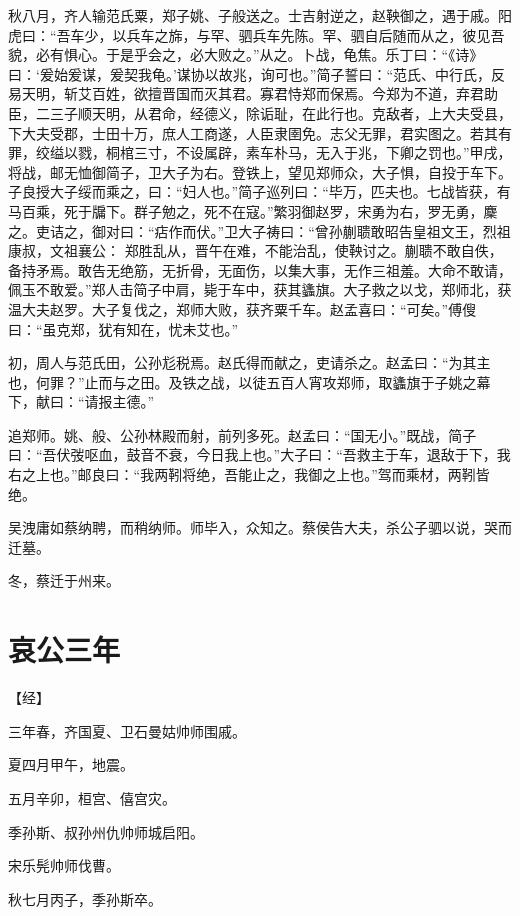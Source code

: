 \documentclass[a4paper,12pt,UTF8,twoside]{ctexbook}
\begin{document}
秋八月，齐人输范氏粟，郑子姚、子般送之。士吉射逆之，赵鞅御之，遇于戚。阳虎曰：“吾车少，以兵车之旆，与罕、驷兵车先陈。罕、驷自后随而从之，彼见吾貌，必有惧心。于是乎会之，必大败之。”从之。卜战，龟焦。乐丁曰：“《诗》曰：‘爰始爰谋，爰契我龟。’谋协以故兆，询可也。”简子誓曰：“范氏、中行氏，反易天明，斩艾百姓，欲擅晋国而灭其君。寡君恃郑而保焉。今郑为不道，弃君助臣，二三子顺天明，从君命，经德义，除诟耻，在此行也。克敌者，上大夫受县，下大夫受郡，士田十万，庶人工商遂，人臣隶圉免。志父无罪，君实图之。若其有罪，绞缢以戮，桐棺三寸，不设属辟，素车朴马，无入于兆，下卿之罚也。”甲戌，将战，邮无恤御简子，卫大子为右。登铁上，望见郑师众，大子惧，自投于车下。子良授大子绥而乘之，曰：“妇人也。”简子巡列曰：“毕万，匹夫也。七战皆获，有马百乘，死于牖下。群子勉之，死不在寇。”繁羽御赵罗，宋勇为右，罗无勇，麇之。吏诘之，御对曰：“痁作而伏。”卫大子祷曰：“曾孙蒯聩敢昭告皇祖文王，烈祖康叔，文祖襄公： 郑胜乱从，晋午在难，不能治乱，使鞅讨之。蒯聩不敢自佚，备持矛焉。敢告无绝筋，无折骨，无面伤，以集大事，无作三祖羞。大命不敢请，佩玉不敢爱。”郑人击简子中肩，毙于车中，获其蠭旗。大子救之以戈，郑师北，获温大夫赵罗。大子复伐之，郑师大败，获齐粟千车。赵孟喜曰：“可矣。”傅傁曰：“虽克郑，犹有知在，忧未艾也。”

初，周人与范氏田，公孙尨税焉。赵氏得而献之，吏请杀之。赵孟曰：“为其主也，何罪？”止而与之田。及铁之战，以徒五百人宵攻郑师，取蠭旗于子姚之幕下，献曰：“请报主德。”

追郑师。姚、般、公孙林殿而射，前列多死。赵孟曰：“国无小。”既战，简子曰：“吾伏弢呕血，鼓音不衰，今日我上也。”大子曰：“吾救主于车，退敌于下，我右之上也。”邮良曰：“我两靷将绝，吾能止之，我御之上也。”驾而乘材，两靷皆绝。

吴洩庸如蔡纳聘，而稍纳师。师毕入，众知之。蔡侯告大夫，杀公子驷以说，哭而迁墓。

冬，蔡迁于州来。



\section{哀公三年}



【经】

三年春，齐国夏、卫石曼姑帅师围戚。

夏四月甲午，地震。

五月辛卯，桓宫、僖宫灾。

季孙斯、叔孙州仇帅师城启阳。

宋乐髡帅师伐曹。

秋七月丙子，季孙斯卒。
\end{document}
